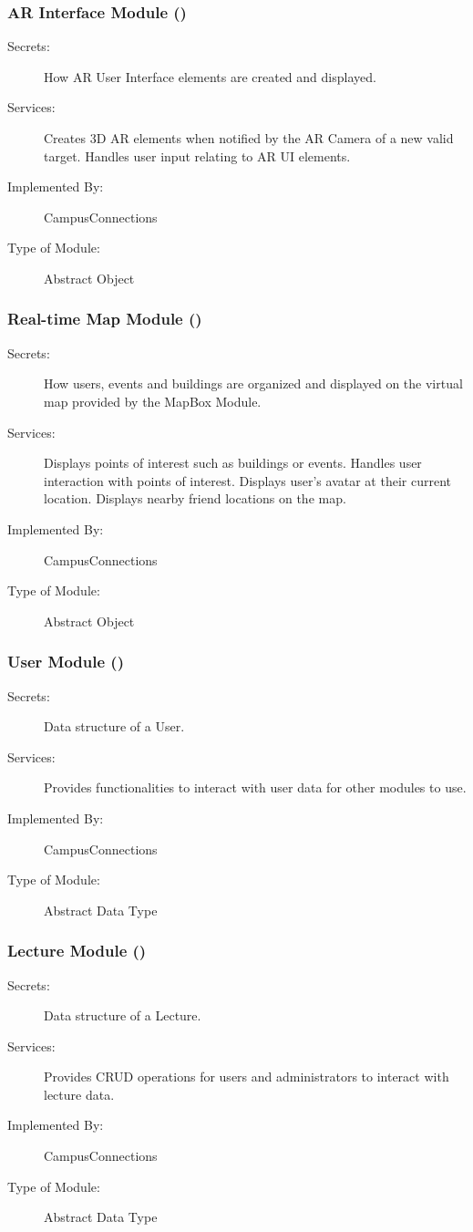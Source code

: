 \documentclass[12pt, titlepage]{article}
\begin{document}
  \subsubsection{AR Interface Module (\label{mARInterface})}
  \begin{description}
  \item[Secrets:]How AR User Interface elements are created and displayed.
  \item[Services:]Creates 3D AR elements when notified by the AR Camera of a new valid target. Handles user input relating to AR UI elements.
  \item[Implemented By:] CampusConnections
  \item[Type of Module:] Abstract Object
  \end{description}
  
  \subsubsection{Real-time Map Module (\label{mRealTimeMap})}
  \begin{description}
  \item[Secrets:]How users, events and buildings are organized and displayed on the virtual map provided by the MapBox Module.
  \item[Services:]Displays points of interest such as buildings or events. Handles user interaction with points of interest. Displays user's avatar at their current location. Displays nearby friend locations on the map.
  \item[Implemented By:] CampusConnections
  \item[Type of Module:] Abstract Object
  \end{description}
  
  \subsubsection{User Module (\label{mUser})}
  \begin{description}
    \item[Secrets:]Data structure of a User.
    \item[Services:]Provides functionalities to interact with user data for other modules to use.
    \item[Implemented By:] CampusConnections
    \item[Type of Module:] Abstract Data Type
  \end{description}
  
  \subsubsection{Lecture Module (\label{mLec})}
  \begin{description}
    \item[Secrets:]Data structure of a Lecture.
    \item[Services:]Provides CRUD operations for users and administrators to interact with lecture data.
    \item[Implemented By:] CampusConnections
    \item[Type of Module:] Abstract Data Type
  \end{description}
  
\end{document}
